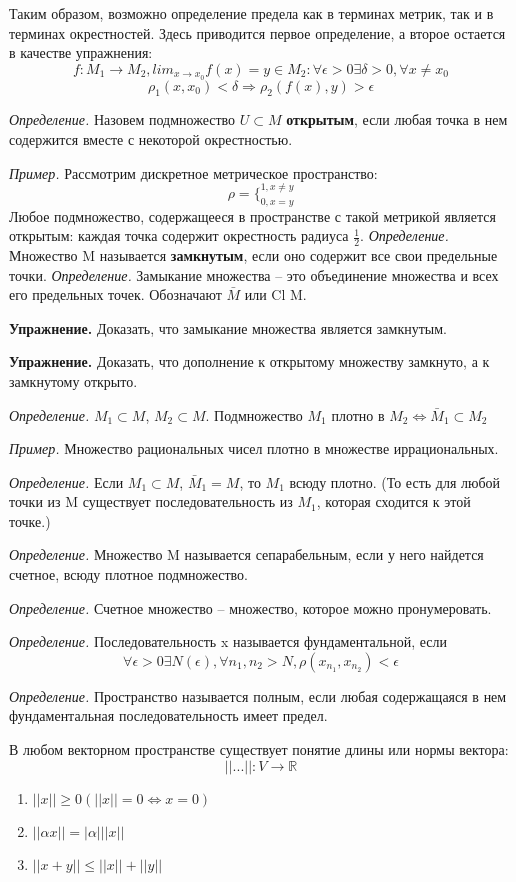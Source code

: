 \documentclass[12pt]{article}
\newcommand{\example}{{\itshape Пример. }}
\newcommand{\equals}{\Leftrightarrow}
\newcommand{\defi}{{\itshape Определение. }}
\newcommand{\exc}{{\bfseries Упражнение. }}
\renewcommand{\leq}{\leqslant}
\renewcommand{\geq}{\geqslant}
\begin{document}
	Таким образом, возможно определение предела как в терминах метрик, так и в терминах окрестностей. Здесь приводится первое определение,
	а второе остается в качестве упражнения:
	$$f : M_1 \rightarrow M_2, lim_{x \rightarrow x_0} f(x) = y \in M_2 : \forall \epsilon > 0 \exists \delta > 0, \forall x \neq x_0$$
	$$\rho_1(x, x_0) < \delta \Rightarrow \rho_2(f(x), y) > \epsilon$$
	
	\defi Назовем подмножество $U \subset M$ \textbf{открытым}, если любая точка в нем содержится вместе с некоторой окрестностью.
	
	\example Рассмотрим дискретное метрическое пространство:
	$$\rho = \{^{1, x \neq y}_{0, x = y}$$
	Любое подмножество, содержащееся в пространстве с такой метрикой является открытым: каждая точка содержит окрестность радиуса 
	$\frac{1}{2}$.
	\defi Множество M называется \textbf{замкнутым}, если оно содержит все свои предельные точки.
	\defi Замыкание множества -- это объединение множества и всех его предельных точек. Обозначают $\bar{M}$ или Cl M.
	
	\exc Доказать, что замыкание множества является замкнутым.
	
	\exc Доказать, что дополнение к открытому множеству замкнуто, а к замкнутому открыто.
	
	\defi $M_1 \subset M$, $M_2 \subset M$. Подмножество $M_1$ плотно в $M_2 \equals \bar{M}_1 \subset M_2$
	
	\example Множество рациональных чисел плотно в множестве иррациональных.
	
	\defi Если $M_1 \subset M$, $\bar{M}_1 = M$, то $M_1$ всюду плотно. (То есть для любой точки из M существует последовательность
	из $M_1$, которая сходится к этой точке.)
	
	\defi Множество M называется сепарабельным, если у него найдется счетное, всюду плотное подмножество.
	
	\defi Счетное множество -- множество, которое можно пронумеровать.
	
	\defi Последовательность x называется фундаментальной, если
	$$\forall \epsilon > 0 \exists N(\epsilon), \forall n_1, n_2 > N, \rho(x_{n_1}, x_{n_2}) < \epsilon$$
	
	\defi Пространство называется полным, если любая содержащаяся в нем фундаментальная последовательность имеет предел.
	
	В любом векторном пространстве существует понятие длины или нормы вектора:
	$$||...|| : V \rightarrow \mathbb{R}$$
	\begin{enumerate}
		\item $||x|| \geq 0 (||x|| = 0 \equals x = 0)$
		\item $||\alpha x|| = |\alpha| ||x||$
		\item $||x + y|| \leq ||x|| + ||y||$
	\end{enumerate}
	
\end{document}
